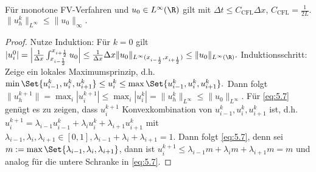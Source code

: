 \begin{st} \label{5.17}
    Für monotone FV-Verfahren und $u_0 \in L^\infty(\R)$ gilt mit $\Delta t \le C_{\text{CFL}} \Delta x$, $C_{\text{CFL}} = \frac{1}{2L}$.
    \begin{math}
        \|u_h^k\|_{L^\infty}
        \le \|u_0\|_{\infty}.
    \end{math}
    \begin{proof}
        Nutze Induktion:
        Für $k = 0$ gilt
        \begin{math}
            |u_i^0| = \Big| \frac{1}{\Delta x} \int_{x_{i-\frac{1}{2}}}^{x_{i+\frac{1}{2}}} u_0 \Big|
            \le \frac{1}{\Delta x} \Delta x \|u_0\|_{L^\infty(x_{i-\frac{1}{2}}, x_{i+\frac{1}{2}})}
            \le \|u_0\|_{L^\infty(\R)}.
        \end{math}
        Induktionsschritt:
        Zeige ein lokales Maximumsprinzip, d.h.
        \begin{math}[numbered] \label{eq:5.7}
            \min\Set{u_{i-1}^k, u_i^k, u_{i+1}^k}
            \le u_i^k
            \le \max\Set{u_{i-1}^k, u_i^k, u_{i+1}^k}.
        \end{math}
        Dann folgt
        \begin{math}
            \|u_h^{k+1}\|
            = \max_{i} |u_i^{k+1}|
            \le \max_i |u_i^k|
            = \|u_h^k\|_{L^\infty}
            \le \|u_0\|_{L^\infty}.
        \end{math}
        Für \eqref{eq:5.7} genügt es zu zeigen, dass $u_i^{k+1}$ Konvexkombination von $u_{i-1}^k, u_i^k, u_{i+1}^k$ ist, d.h.
        \begin{math}
            u_i^{k+1} = \lambda_{i-1} u_{i-1}^k + \lambda_i u_i^k + \lambda_{i+1} u_{i+1}^k
        \end{math}
        mit $\lambda_{i-1}, \lambda_i, \lambda_{i+1} \in [0,1], \lambda_{i-1} + \lambda_i + \lambda_{i+1} = 1$.
        Dann folgt \eqref{eq:5.7}, denn sei $m := \max \Set{\lambda_{i-1}, \lambda_i, \lambda_{i+1}}$, dann ist
        \begin{math}
            u_i^{k+1}
            \le \lambda_{i-1} m + \lambda_i m + \lambda_{i+1} m
            = m
        \end{math}
        und analog für die untere Schranke in \eqref{eq:5.7}.


\end{proof}
\end{st}
